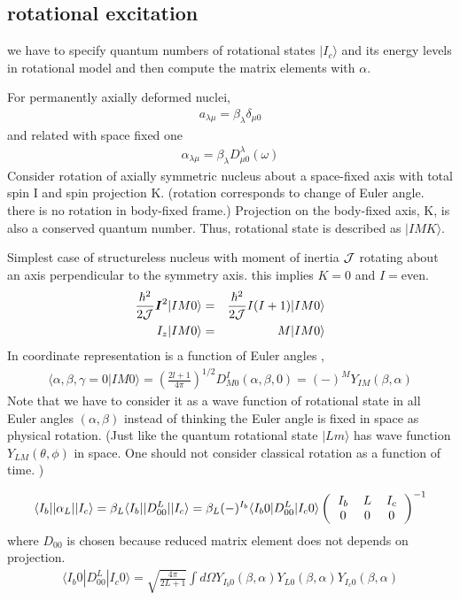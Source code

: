 \documentclass[11pt]{book}
\def\bm{\boldsymbol}
\def\la{\langle}
\def\ra{\rangle}
\newcommand{\bea}{\begin{eqnarray}}
\newcommand{\eea}{\end{eqnarray}}
\newcommand{\no}{\nonumber \\}
\newcommand{\threejsymbol}[6]{\left(\begin{tabular}{ccc} {$#1$}&{$#2$}&{$#3$}\\
                             {$#4$}&{$#5$}&{$#6$}\end{tabular}\right)}
\begin{document}
\subsection{rotational excitation}
we have to specify quantum numbers of rotational states $|I_c\ra$ and its energy levels
in rotational model and then compute the matrix elements with $\alpha$.

For permanently axially deformed nuclei,
\bea 
a_{\lambda\mu}=\beta_\lambda \delta_{\mu 0}
\eea 
and related with space fixed one
\bea 
\alpha_{\lambda\mu}=\beta_\lambda D^\lambda_{\mu 0}(\omega)
\eea 
Consider rotation of axially symmetric nucleus about a space-fixed axis with total spin I and spin projection K. (rotation corresponds to change of Euler angle. there is no rotation in body-fixed frame.)
Projection on the body-fixed axis, K,  is also a conserved quantum number. Thus,
rotational state is described as $|I M K\ra$.

Simplest case of structureless nucleus with moment of inertia ${\cal J}$ rotating about 
an axis perpendicular to the symmetry axis. this implies $K=0$ and $I=$even. 
\bea 
\frac{\hbar^2}{2{\cal J}} {\bm I}^2|IM0\ra &=& \frac{\hbar^2}{2{\cal J}} I(I+1)|IM0\ra \no 
I_z |I M 0\ra &=& M |I M 0\ra 
\eea 
In coordinate representation is a function of Euler angles ,
\bea 
\la \alpha,\beta,\gamma=0| I M 0\ra = \left(\frac{2l+1}{4\pi}\right)^{1/2} D^{I}_{M0}(\alpha,\beta,0)
 =(-)^M Y_{IM}(\beta,\alpha)
\eea 
Note that we have to consider it as a wave function of rotational state 
in all Euler angles $(\alpha,\beta)$ instead of thinking the Euler angle is fixed in space
as physical rotation. (Just like the quantum rotational state $|Lm\ra$ 
has wave function $Y_{LM}(\theta,\phi)$ in space. One should not consider classical rotation
as a function of time. )

\bea 
\la I_b||\alpha_L||I_c\ra = \beta_L \la I_b||D^{L}_{00}||I_c\ra 
                         = \beta_L (-)^{I_b}\la I_b 0|D^L_{00}|I_c 0\ra 
                           \threejsymbol{I_b}{L}{I_c}{0}{0}{0}^{-1}
\eea 
where $D_{00}$ is chosen because reduced matrix element does not depends on projection.
\bea 
\la I_b 0| D_{00}^L|I_c 0\ra = \sqrt{\frac{4\pi}{2L+1}}\int d\Omega Y_{I_b 0}(\beta,\alpha)
                                 Y_{L0}(\beta,\alpha) Y_{I_c 0}(\beta,\alpha)
\eea 
\end{document}
